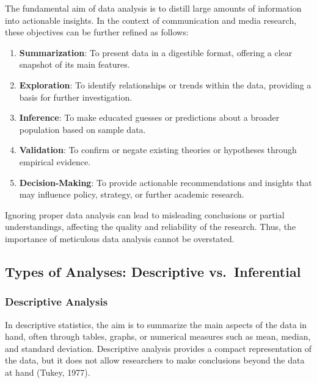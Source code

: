 \documentclass[
  b5paper]{book}
\providecommand{\tightlist}{%
  \setlength{\itemsep}{0pt}\setlength{\parskip}{0pt}}
\begin{document}
The fundamental aim of data analysis is to distill large amounts of information into actionable insights. In the context of communication and media research, these objectives can be further refined as follows:

\begin{enumerate}
\def\labelenumi{\arabic{enumi}.}
\tightlist
\item
  \textbf{Summarization}: To present data in a digestible format, offering a clear snapshot of its main features.
\item
  \textbf{Exploration}: To identify relationships or trends within the data, providing a basis for further investigation.
\item
  \textbf{Inference}: To make educated guesses or predictions about a broader population based on sample data.
\item
  \textbf{Validation}: To confirm or negate existing theories or hypotheses through empirical evidence.
\item
  \textbf{Decision-Making}: To provide actionable recommendations and insights that may influence policy, strategy, or further academic research.
\end{enumerate}

Ignoring proper data analysis can lead to misleading conclusions or partial understandings, affecting the quality and reliability of the research. Thus, the importance of meticulous data analysis cannot be overstated.

\hypertarget{types-of-analyses-descriptive-vs.-inferential}{%
\subsection{Types of Analyses: Descriptive vs.~Inferential}\label{types-of-analyses-descriptive-vs.-inferential}}

\hypertarget{descriptive-analysis}{%
\subsubsection{Descriptive Analysis}\label{descriptive-analysis}}

In descriptive statistics, the aim is to summarize the main aspects of the data in hand, often through tables, graphs, or numerical measures such as mean, median, and standard deviation. Descriptive analysis provides a compact representation of the data, but it does not allow researchers to make conclusions beyond the data at hand (Tukey, 1977).
\end{document}

